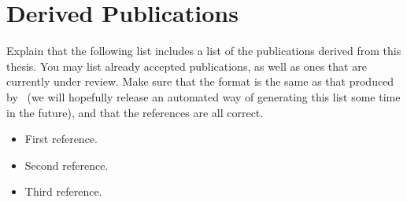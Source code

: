
\chapter{Derived Publications}
\label{app:derived_publications}

Explain that the following list includes a list of the publications derived from this thesis. You may list already accepted publications, as well as ones that are currently under review. Make sure that the format is the same as that produced by \BIBTeX\ (we will hopefully release an automated way of generating this list some time in the future), and that the references are all correct.

\begin{itemize}
	\item First reference.
	
	\item Second reference.
	
	\item Third reference.
\end{itemize}

